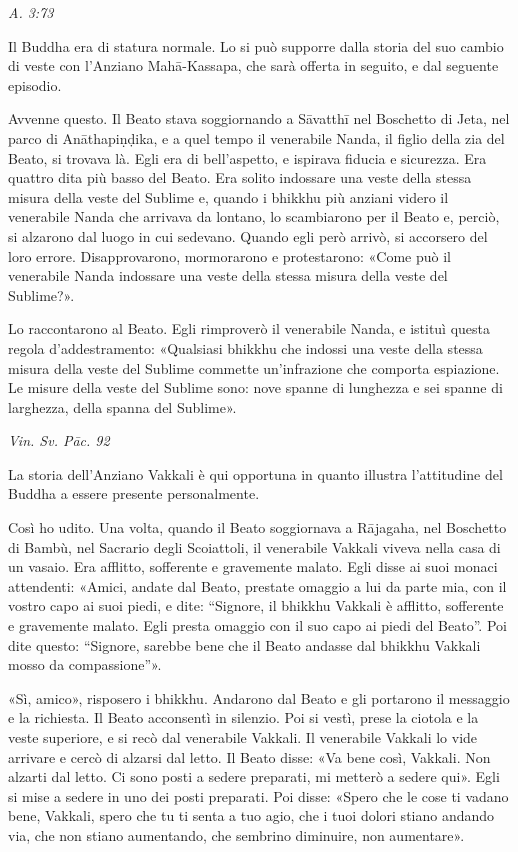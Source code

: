 \emph{A. 3:73}


 Il Buddha era di statura normale. Lo si può supporre
dalla storia del suo cambio di veste con l’Anziano Mahā-Kassapa, che
sarà offerta in seguito, e dal seguente episodio.


 Avvenne questo. Il Beato stava soggiornando a Sāvatthī nel
Boschetto di Jeta, nel parco di Anāthapiṇḍika, e a quel tempo il
venerabile Nanda, il figlio della zia del Beato, si trovava là. Egli era
di bell’aspetto, e ispirava fiducia e sicurezza. Era quattro dita più
basso del Beato. Era solito indossare una veste della stessa misura
della veste del Sublime e, quando i bhikkhu più anziani videro il
venerabile Nanda che arrivava da lontano, lo scambiarono per il Beato e,
perciò, si alzarono dal luogo in cui sedevano. Quando egli però arrivò,
si accorsero del loro errore. Disapprovarono, mormorarono e
protestarono: «Come può il venerabile Nanda indossare una veste della
stessa misura della veste del Sublime?».


Lo raccontarono al Beato. Egli rimproverò il venerabile Nanda, e istituì
questa regola d’addestramento: «Qualsiasi bhikkhu che indossi una veste
della stessa misura della veste del Sublime commette un’infrazione che
comporta espiazione. Le misure della veste del Sublime sono: nove spanne
di lunghezza e sei spanne di larghezza, della spanna del Sublime».


\emph{Vin. Sv. Pāc. 92}


 La storia dell’Anziano Vakkali è qui opportuna in
quanto illustra l’attitudine del Buddha a essere presente personalmente.


 Così ho udito. Una volta, quando il Beato soggiornava a
Rājagaha, nel Boschetto di Bambù, nel Sacrario degli Scoiattoli, il
venerabile Vakkali viveva nella casa di un vasaio. Era afflitto,
sofferente e gravemente malato. Egli disse ai suoi monaci attendenti:
«Amici, andate dal Beato, prestate omaggio a lui da parte mia, con il
vostro capo ai suoi piedi, e dite: “Signore, il bhikkhu Vakkali è
afflitto, sofferente e gravemente malato. Egli presta omaggio con il suo
capo ai piedi del Beato”. Poi dite questo: “Signore, sarebbe bene che il
Beato andasse dal bhikkhu Vakkali mosso da compassione”».


«Sì, amico», risposero i bhikkhu. Andarono dal Beato e gli portarono il
messaggio e la richiesta. Il Beato acconsentì in silenzio. Poi si vestì,
prese la ciotola e la veste superiore, e si recò dal venerabile Vakkali.
Il venerabile Vakkali lo vide arrivare e cercò di alzarsi dal letto. Il
Beato disse: «Va bene così, Vakkali. Non alzarti dal letto. Ci sono
posti a sedere preparati, mi metterò a sedere qui». Egli si mise a
sedere in uno dei posti preparati. Poi disse: «Spero che le cose ti
vadano bene, Vakkali, spero che tu ti senta a tuo agio, che i tuoi
dolori stiano andando via, che non stiano aumentando, che sembrino
diminuire, non aumentare».


